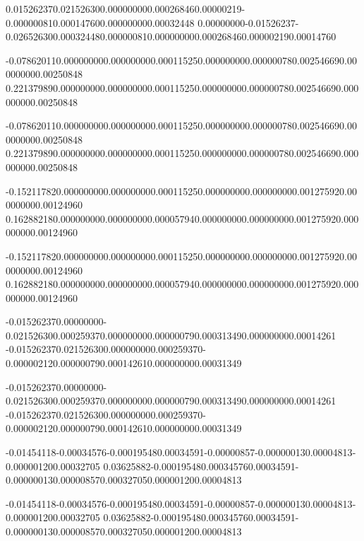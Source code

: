 {{0.01526237}{0.02152630}{0.00000000}{0.00026846}{0.00000219}{-0.00000081}{0.00014760}{0.00000000}{0.00032448}}
{{0.00000000}{-0.01526237}{-0.02652630}{0.00032448}{0.00000081}{0.00000000}{0.00026846}{0.00000219}{0.00014760}}

{{-0.07862011}{0.00000000}{0.00000000}{0.00011525}{0.00000000}{0.00000078}{0.00254669}{0.00000000}{0.00250848}}
{{0.22137989}{0.00000000}{0.00000000}{0.00011525}{0.00000000}{0.00000078}{0.00254669}{0.00000000}{0.00250848}}

{{-0.07862011}{0.00000000}{0.00000000}{0.00011525}{0.00000000}{0.00000078}{0.00254669}{0.00000000}{0.00250848}}
{{0.22137989}{0.00000000}{0.00000000}{0.00011525}{0.00000000}{0.00000078}{0.00254669}{0.00000000}{0.00250848}}

{{-0.15211782}{0.00000000}{0.00000000}{0.00011525}{0.00000000}{0.00000000}{0.00127592}{0.00000000}{0.00124960}}
{{0.16288218}{0.00000000}{0.00000000}{0.00005794}{0.00000000}{0.00000000}{0.00127592}{0.00000000}{0.00124960}}

{{-0.15211782}{0.00000000}{0.00000000}{0.00011525}{0.00000000}{0.00000000}{0.00127592}{0.00000000}{0.00124960}}
{{0.16288218}{0.00000000}{0.00000000}{0.00005794}{0.00000000}{0.00000000}{0.00127592}{0.00000000}{0.00124960}}

{{-0.01526237}{0.00000000}{-0.02152630}{0.00025937}{0.00000000}{0.00000079}{0.00031349}{0.00000000}{0.00014261}}
{{-0.01526237}{0.02152630}{0.00000000}{0.00025937}{0-0.00000212}{0.00000079}{0.00014261}{0.00000000}{0.00031349}}

{{-0.01526237}{0.00000000}{-0.02152630}{0.00025937}{0.00000000}{0.00000079}{0.00031349}{0.00000000}{0.00014261}}
{{-0.01526237}{0.02152630}{0.00000000}{0.00025937}{0-0.00000212}{0.00000079}{0.00014261}{0.00000000}{0.00031349}}

{{-0.01454118}{-0.00034576}{-0.00019548}{0.00034591}{-0.00000857}{-0.00000013}{0.00004813}{-0.00000120}{0.00032705}}
{{0.03625882}{-0.00019548}{0.00034576}{0.00034591}{-0.00000013}{0.00000857}{0.00032705}{0.00000120}{0.00004813}}

{{-0.01454118}{-0.00034576}{-0.00019548}{0.00034591}{-0.00000857}{-0.00000013}{0.00004813}{-0.00000120}{0.00032705}}
{{0.03625882}{-0.00019548}{0.00034576}{0.00034591}{-0.00000013}{0.00000857}{0.00032705}{0.00000120}{0.00004813}}
